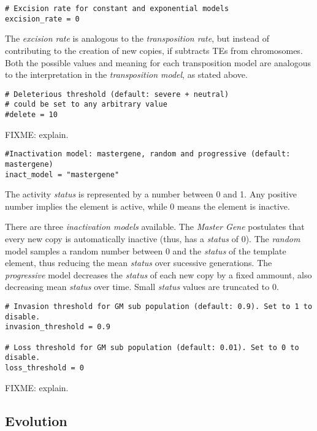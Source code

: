 \documentclass[10pt]{article}
\begin{document}
\begin{verbatim}
# Excision rate for constant and exponential models
excision_rate = 0
\end{verbatim}

The {\em excision rate} is analogous to the {\em transposition rate},
but instead of contributing to the creation of new copies, if
subtracts TEs from chromosomes. Both the possible values and meaning
for each transposition model are analogous to the interpretation in
the {\em transposition model}, as stated above.

\begin{verbatim}
# Deleterious threshold (default: severe + neutral)
# could be set to any arbitrary value
#delete = 10
\end{verbatim}

FIXME: explain.

\begin{verbatim}
#Inactivation model: mastergene, random and progressive (default: mastergene)
inact_model = "mastergene"
\end{verbatim}

The activity {\em status} is represented by a number between 0 and
1. Any positive number implies the element is active, while 0 means
the element is inactive.

There are three {\em inactivation models} available. The {\em Master
  Gene} postulates that every new copy is automatically inactive
(thus, has a {\em status} of 0). The {\em random} model samples a
random number between 0 and the {\em status} of the template element,
thus reducing the mean {\em status} over sucessive generations. The
{\em progressive} model decreases the {\em status} of each new copy by
a fixed ammount, also decreasing mean {\em status} over time. Small
{\em status} values are truncated to 0.

\begin{verbatim}
# Invasion threshold for GM sub population (default: 0.9). Set to 1 to disable.
invasion_threshold = 0.9

# Loss threshold for GM sub population (default: 0.01). Set to 0 to disable.
loss_threshold = 0
\end{verbatim}

FIXME: explain.

\subsection{Evolution}
\label{sec:default_config_evolution}
\end{document}
